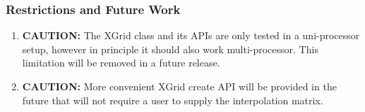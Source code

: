 
\subsubsection{Restrictions and Future Work}

\begin{enumerate}
\label{XGrid:rest}

\item {\bf CAUTION:} The XGrid class and its APIs are only tested in a 
uni-processor setup, however in principle it should also work multi-processor. 
This limitation will be removed in a future release.
\item {\bf CAUTION:} More convenient XGrid create API will be provided in
the future that will not require a user to supply the interpolation matrix.

\end{enumerate}



